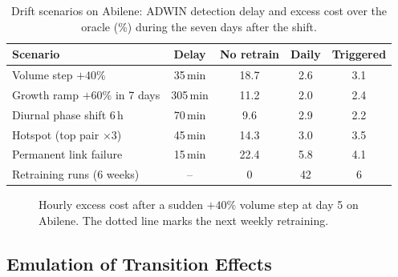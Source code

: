 \documentclass[conference]{IEEEtran}
\begin{document}
\begin{table}[t]
\centering
\caption{Drift scenarios on Abilene: ADWIN detection delay and excess cost over the oracle (\%) during the seven days after the shift.}
\label{tab:drift}
\footnotesize
\setlength{\tabcolsep}{3pt}
\begin{tabular}{@{}lcccc@{}}
\toprule
Scenario & Delay & No retrain & Daily & Triggered \\
\midrule
Volume step $+40\%$ & 35\,min & 18.7 & 2.6 & 3.1 \\
Growth ramp $+60\%$ in 7 days & 305\,min & 11.2 & 2.0 & 2.4 \\
Diurnal phase shift 6\,h & 70\,min & 9.6 & 2.9 & 2.2 \\
Hotspot (top pair $\times3$) & 45\,min & 14.3 & 3.0 & 3.5 \\
Permanent link failure & 15\,min & 22.4 & 5.8 & 4.1 \\
\midrule
Retraining runs (6 weeks) & -- & 0 & 42 & 6 \\
\bottomrule
\end{tabular}
\end{table}

\begin{figure}[t]
\centering
{}
\caption{Hourly excess cost after a sudden $+40\%$ volume step at day 5 on Abilene. The dotted line marks the next weekly retraining.}
\label{fig:drift}
\end{figure}

\subsection{Emulation of Transition Effects}
\end{document}

